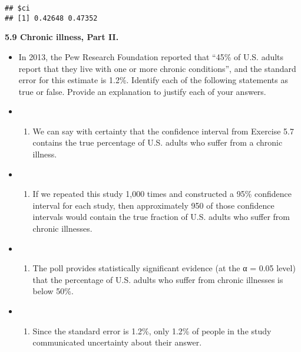\documentclass[]{book}
\providecommand{\tightlist}{%
  \setlength{\itemsep}{0pt}\setlength{\parskip}{0pt}}
\begin{document}
\begin{verbatim}
## $ci
## [1] 0.42648 0.47352
\end{verbatim}

\textbf{5.9 Chronic illness, Part II.}

\begin{itemize}
\item
  In 2013, the Pew Research Foundation reported that ``45\% of U.S. adults report that they live with one or more chronic conditions'', and the standard error for this estimate is 1.2\%.
  Identify each of the following statements as true or false. Provide an explanation to justify each of your answers.
\item
  \begin{enumerate}
  \def\labelenumi{(\alph{enumi})}
  \tightlist
  \item
    We can say with certainty that the confidence interval from Exercise 5.7 contains the true percentage of U.S. adults who suffer from a chronic illness.
  \end{enumerate}
\item
  \begin{enumerate}
  \def\labelenumi{(\alph{enumi})}
  \setcounter{enumi}{1}
  \tightlist
  \item
    If we repeated this study 1,000 times and constructed a 95\% confidence interval for each study, then approximately 950 of those confidence intervals would contain the true fraction of U.S. adults who suffer from chronic illnesses.
  \end{enumerate}
\item
  \begin{enumerate}
  \def\labelenumi{(\alph{enumi})}
  \setcounter{enumi}{2}
  \tightlist
  \item
    The poll provides statistically significant evidence (at the α = 0.05 level) that the percentage of U.S. adults who suffer from chronic illnesses is below 50\%.
  \end{enumerate}
\item
  \begin{enumerate}
  \def\labelenumi{(\alph{enumi})}
  \setcounter{enumi}{3}
  \tightlist
  \item
    Since the standard error is 1.2\%, only 1.2\% of people in the study communicated uncertainty about their answer.
  \end{enumerate}
\end{itemize}
\end{document}
